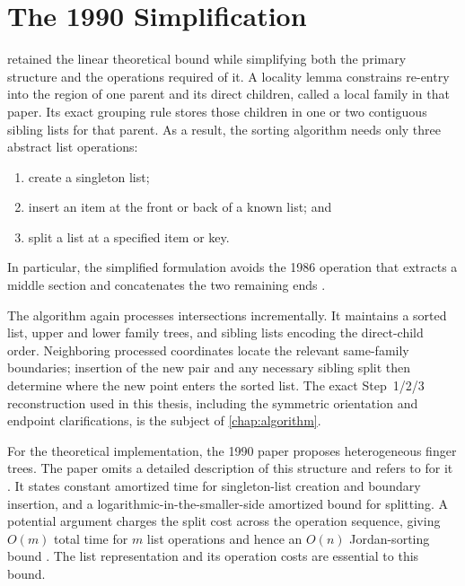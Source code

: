 \section{The 1990 Simplification}
\label{sec:background-1990}

\textcite{fung1990simplified} retained the linear theoretical bound while
simplifying both the primary structure and the operations required of it. A
locality lemma constrains re-entry into the region of one parent and its
direct children, called a local family in that paper. Its exact grouping rule
stores those children in one or two contiguous sibling lists for that parent.
As a result, the
sorting algorithm needs only three abstract list operations:
\begin{enumerate}
  \item create a singleton list;
  \item insert an item at the front or back of a known list; and
  \item split a list at a specified item or key.
\end{enumerate}
In particular, the simplified formulation avoids the 1986 operation that
extracts a middle section and concatenates the two remaining ends
\parencite[pp.~86,88--90]{fung1990simplified}.

The algorithm again processes intersections incrementally. It maintains a
sorted list, upper and lower family trees, and sibling lists encoding the
direct-child order. Neighboring processed coordinates locate the relevant
same-family boundaries; insertion of the new pair and any necessary sibling
split then determine where the new point enters the sorted list. The exact
Step~1/2/3 reconstruction used in this thesis, including the symmetric
orientation and endpoint clarifications, is the subject of
\cref{chap:algorithm}.

For the theoretical implementation, the 1990 paper proposes heterogeneous
finger trees. The paper omits a detailed description of this structure and
refers to \textcite{tarjan1988triangulating} for it
\parencite[p.~90]{fung1990simplified}. It states constant amortized time for singleton-list creation
and boundary insertion, and a logarithmic-in-the-smaller-side amortized bound
for splitting. A potential argument charges the split cost across the
operation sequence, giving $O(m)$ total time for $m$ list operations and
hence an $O(n)$ Jordan-sorting bound
\parencite[pp.~90--91]{fung1990simplified}. The list representation and its
operation costs are essential to this bound.

